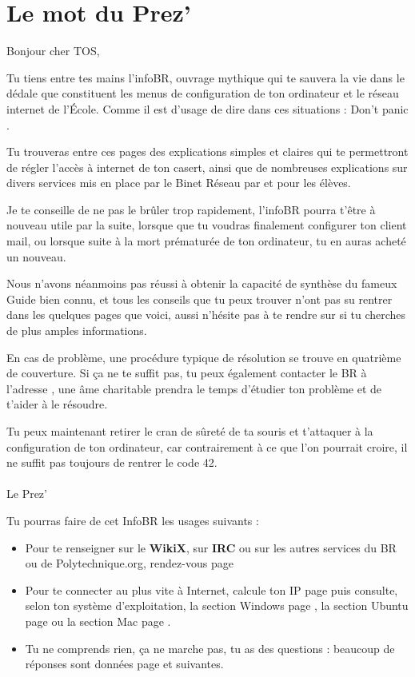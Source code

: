 \thispagestyle{empty}

\section*{Le mot du Prez'}

Bonjour cher TOS,

Tu tiens entre tes mains l'infoBR, ouvrage mythique qui te sauvera la vie dans le d\'edale que constituent les menus de configuration de ton ordinateur et le r\'eseau internet de l'\'Ecole. Comme il est d'usage de dire dans ces situations :  \og Don't panic \fg .

Tu trouveras entre ces pages des explications simples et claires qui te permettront de r\'egler l'acc\`es \`a internet de ton casert, ainsi que de nombreuses explications sur divers services mis en place par le Binet R\'eseau par et pour les \'el\`eves.

Je te conseille de ne pas le br\^uler trop rapidement, l'infoBR pourra t'\^etre \`a nouveau utile par la suite, lorsque que tu voudras finalement configurer ton client mail, ou lorsque suite \`a la mort pr\'ematur\'ee de ton ordinateur, tu en auras achet\'e un nouveau.

Nous n'avons n\'eanmoins pas r\'eussi \`a obtenir la capacit\'e de synth\`ese du fameux Guide bien connu, et tous les conseils que tu peux trouver n'ont pas su rentrer dans les quelques pages que voici, aussi n'h\'esite pas \`a te rendre sur  si tu cherches de plus amples informations.

En cas de probl\`eme, une proc\'edure typique de r\'esolution se trouve en quatri\`eme de couverture. Si \c{c}a ne te suffit pas, tu peux \'egalement contacter le BR \`a l'adresse \newline {}, une \^ame charitable prendra le temps d'\'etudier ton probl\`eme et de t'aider \`a le r\'esoudre.

Tu peux maintenant retirer le cran de s\^uret\'e de ta souris et t'attaquer \`a la configuration de ton ordinateur, car contrairement \`a ce que l'on pourrait croire, il ne suffit pas toujours de rentrer le code 42.
\\
\\
Le Prez'

\vfill


Tu pourras faire de cet InfoBR les usages suivants :
\begin{itemize}
\item Pour te renseigner sur le \textbf{WikiX}, sur \textbf{IRC} ou sur les autres services du BR ou de Polytechnique.org, rendez-vous page \pageref{services}
\item Pour te connecter au plus vite \`a Internet, calcule ton IP page \pageref{ip} puis consulte, selon ton syst\`eme d'exploitation, la section Windows page \pageref{windows},
la section Ubuntu page \pageref{ubuntu} ou la section Mac page \pageref{mac}.
\item Tu ne comprends rien, \c{c}a ne marche pas, tu as des questions : beaucoup de r\'eponses sont donn\'ees page \pageref{faq} et suivantes.

\end{itemize}

